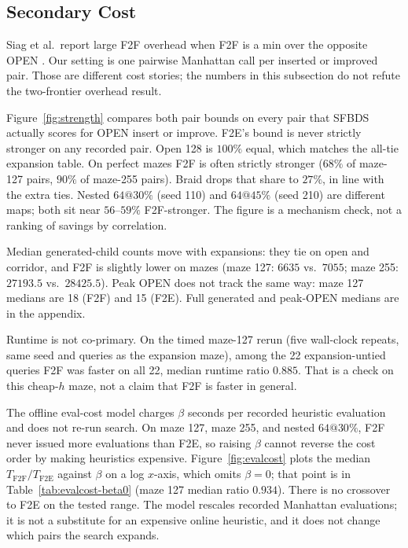 \subsection{Secondary Cost}

Siag et al.\ report large F2F overhead when F2F is a min over the opposite OPEN \cite{siag2023socs}. Our setting is one pairwise Manhattan call per inserted or improved pair. Those are different cost stories; the numbers in this subsection do not refute the two-frontier overhead result.

Figure~\ref{fig:strength} compares both pair bounds on every pair that SFBDS actually scores for OPEN insert or improve. F2E's bound is never strictly stronger on any recorded pair. Open 128 is \(100\%\) equal, which matches the all-tie expansion table. On perfect mazes F2F is often strictly stronger (\(68\%\) of maze-127 pairs, \(90\%\) of maze-255 pairs). Braid drops that share to \(27\%\), in line with the extra ties. Nested \(64@30\%\) (seed 110) and \(64@45\%\) (seed 210) are different maps; both sit near \(56\)--\(59\%\) F2F-stronger. The figure is a mechanism check, not a ranking of savings by correlation.

Median generated-child counts move with expansions: they tie on open and corridor, and F2F is slightly lower on mazes (maze 127: \(6635\) vs.\ \(7055\); maze 255: \(27193.5\) vs.\ \(28425.5\)). Peak OPEN does not track the same way: maze 127 medians are 18 (F2F) and 15 (F2E). Full generated and peak-OPEN medians are in the appendix.

Runtime is not co-primary. On the timed maze-127 rerun (five wall-clock repeats, same seed and queries as the expansion maze), among the 22 expansion-untied queries F2F was faster on all 22, median runtime ratio \(0.885\). That is a check on this cheap-\(h\) maze, not a claim that F2F is faster in general.

The offline eval-cost model charges \(\beta\) seconds per recorded heuristic evaluation and does not re-run search. On maze 127, maze 255, and nested \(64@30\%\), F2F never issued more evaluations than F2E, so raising \(\beta\) cannot reverse the cost order by making heuristics expensive. Figure~\ref{fig:evalcost} plots the median \(T_{\mathrm{F2F}}/T_{\mathrm{F2E}}\) against \(\beta\) on a log \(x\)-axis, which omits \(\beta=0\); that point is in Table~\ref{tab:evalcost-beta0} (maze 127 median ratio \(0.934\)). There is no crossover to F2E on the tested range. The model rescales recorded Manhattan evaluations; it is not a substitute for an expensive online heuristic, and it does not change which pairs the search expands.

